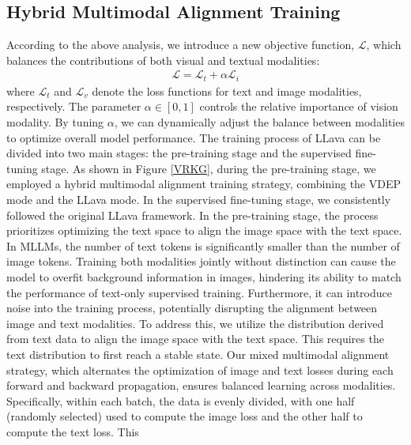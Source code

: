 \subsection{Hybrid Multimodal Alignment Training}
According to the above analysis, we introduce a new objective function, $\mathcal{L}$, which balances the contributions of both visual and textual modalities:
\begin{equation}
\begin{aligned}
\textstyle
\mathcal{L} =\mathcal{L}_t +  \alpha \mathcal{L}_i
\end{aligned}
\end{equation}
where $\mathcal{L}_t$ and $\mathcal{L}_v$ denote the loss functions for text and image modalities, respectively. The parameter $\alpha \in [0, 1]$ controls the relative importance of vision modality. By tuning $\alpha$, we can dynamically adjust the balance between modalities to optimize overall model performance.
The training process of LLava can be divided into two main stages: the pre-training stage and the supervised fine-tuning stage. As shown in Figure \ref{VRKG}, during the pre-training stage, we employed a hybrid multimodal alignment training strategy, combining the VDEP mode and the LLava mode. In the supervised fine-tuning stage, we consistently followed the original LLava framework.
In the pre-training stage, the process prioritizes optimizing the text space to align the image space with the text space. In MLLMs, the number of text tokens is significantly smaller than the number of image tokens. Training both modalities jointly without distinction can cause the model to overfit background information in images, hindering its ability to match the performance of text-only supervised training. Furthermore, it can introduce noise into the training process, potentially disrupting the alignment between image and text modalities.
To address this, we utilize the distribution derived from text data to align the image space with the text space. This requires the text distribution to first reach a stable state. Our mixed multimodal alignment strategy, which alternates the optimization of image and text losses during each forward and backward propagation, ensures balanced learning across modalities. Specifically, within each batch, the data is evenly divided, with one half (randomly selected) used to compute the image loss and the other half to compute the text loss. This
